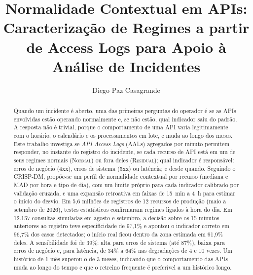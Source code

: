 \documentclass[sigconf,nonacm]{acmart}
\newcommand{\Normal}{\textsc{Normal}\xspace}
\newcommand{\Residual}{\textsc{Residual}\xspace}
\begin{document}
\title{Normalidade Contextual em APIs: Caracterização de Regimes a partir de Access Logs para Apoio à Análise de Incidentes}

\author{Diego Paz Casagrande}

\renewcommand{\shortauthors}{D. P. Casagrande}

\begin{abstract}
Quando um incidente é aberto, uma das primeiras perguntas do operador é se as APIs envolvidas estão operando normalmente e, se não estão, qual indicador saiu do padrão. A resposta não é trivial, porque o comportamento de uma API varia legitimamente com o horário, o calendário e os processamentos em lote, e muda ao longo dos meses. Este trabalho investiga se \emph{API Access Logs} (AALs) agregados por minuto permitem responder, no instante do registro do incidente, se cada recurso de API está em um de seus regimes normais (\Normal) ou fora deles (\Residual); qual indicador é responsável: erros de negócio (4xx), erros de sistema (5xx) ou latência; e desde quando. Seguindo o CRISP-DM, propõe-se um perfil de normalidade contextual por recurso (mediana e MAD por hora e tipo de dia), com um limite próprio para cada indicador calibrado por validação cruzada, e uma expansão retroativa em faixas de 15~min a 4~h para estimar o início do desvio. Em 5,6 milhões de registros de 12 recursos de produção (maio a setembro de 2026), testes estatísticos confirmaram regimes ligados à hora do dia. Em 12.157 consultas simuladas em agosto e setembro, a decisão sobre os 15 minutos anteriores ao registro teve especificidade de 97,1\% e apontou o indicador correto em 96,7\% dos casos detectados; o início real ficou dentro da zona estimada em 91,9\% deles. A sensibilidade foi de 39\%: alta para erros de sistema (até 87\%), baixa para erros de negócio e, para latência, de 34\% a 64\% nas degradações de 4 e 10 vezes. Um histórico de 1 mês superou o de 3 meses, indicando que o comportamento das APIs muda ao longo do tempo e que o retreino frequente é preferível a um histórico longo.
\end{abstract}


\maketitle
\end{document}
